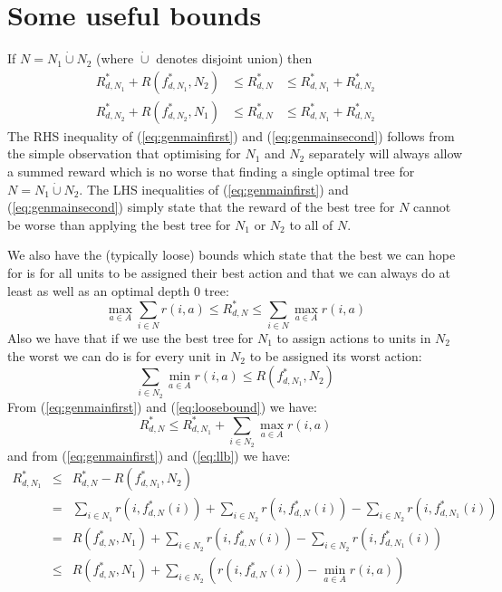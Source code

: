 \documentclass{article}
\begin{document}
\section{Some useful bounds}
\label{sec:bounds}

If $N = N_{1} \dot\cup N_{2}$ (where $\dot\cup$ denotes disjoint
union) then
\begin{eqnarray}
  \label{eq:genmainfirst}
 R^{*}_{d,N_{1}} + R(f^{*}_{d,N_{1}},N_{2})  & \leq R^{*}_{d,N}  & \leq  R^{*}_{d,N_{1}} + R^{*}_{d,N_{2}} \\
  \label{eq:genmainsecond} R^{*}_{d,N_{2}} + R(f^{*}_{d,N_{2}},N_{1})  & \leq R^{*}_{d,N}  & \leq  R^{*}_{d,N_{1}} + R^{*}_{d,N_{2}} 
\end{eqnarray}
The RHS inequality of (\ref{eq:genmainfirst}) and
(\ref{eq:genmainsecond}) follows from the simple observation that
optimising for $N_1$ and $N_2$ separately will always allow a summed
reward which is no worse that finding a single optimal tree for
$N = N_{1} \dot\cup N_{2}$. The LHS inequalities of
(\ref{eq:genmainfirst}) and (\ref{eq:genmainsecond}) simply state that
the reward of the best tree for $N$ cannot be worse than applying the
best tree for $N_{1}$ or $N_2$ to all of $N$.

We also have the (typically loose) bounds which  state that
the best we can hope for is for all units to be assigned their best
action and that we can always do at least as well as an optimal depth 0 tree:
\begin{equation}
  \label{eq:loosebound}
\max_{a \in A} \sum_{i \in N}  r(i,a) \leq  R^{*}_{d,N} \leq \sum_{i \in N} \max_{a \in A} r(i,a) 
\end{equation}
Also we have that if we use the best tree for $N_{1}$ to assign
actions to units in $N_2$ the worst we can do is for every unit in
$N_2$ to be assigned its worst action:
\begin{equation}
  \label{eq:llb}
\sum_{i \in N_{2}} \min_{a \in A} r(i,a) \leq R(f^{*}_{d,N_{1}},N_{2})  
\end{equation}
From (\ref{eq:genmainfirst}) and (\ref{eq:loosebound})  we have:
\begin{equation}
  \label{eq:ub}
R^{*}_{d,N}   \leq  R^{*}_{d,N_{1}} + \sum_{i \in N_{2}} \max_{a \in A} r(i,a) 
\end{equation}
and from (\ref{eq:genmainfirst}) and (\ref{eq:llb}) we have:
\begin{eqnarray}
  \label{eq:lb}
  R^{*}_{d,N_{1}}
  & \leq
  & R^{*}_{d,N} -  R(f^{*}_{d,N_{1}},N_{2})
  \nonumber \\
  & =
  & \sum_{i\in N_{1}} r(i, f^{*}_{d,N}(i)) + \sum_{i\in N_{2}} r(i,
    f^{*}_{d,N}(i))
    - \sum_{i\in N_{2}} r(i,
    f^{*}_{d,N_{1}}(i)) \nonumber \\
  & =
  & R(f^{*}_{d,N},N_{1})
    + \sum_{i\in N_{2}} r(i,
    f^{*}_{d,N}(i))
    - \sum_{i\in N_{2}} r(i,
    f^{*}_{d,N_{1}}(i)) \nonumber \\
  & \leq
  & R(f^{*}_{d,N},N_{1}) + \sum_{i\in N_{2}} \left(
    r(i,f^{*}_{d,N}(i)) - \min_{a \in A} r(i,a) \right)
\end{eqnarray}
\end{document}

